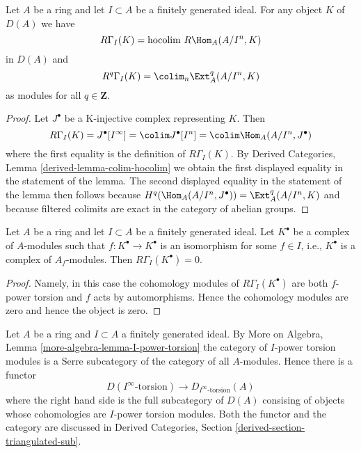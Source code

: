 \begin{lemma}
\label{lemma-local-cohomology-ext}
Let $A$ be a ring and let $I \subset A$ be a finitely generated ideal.
For any object $K$ of $D(A)$ we have
$$
R\Gamma_I(K) = \text{hocolim}\ R\Hom_A(A/I^n, K)
$$
in $D(A)$ and
$$
R^q\Gamma_I(K) = \colim_n \Ext_A^q(A/I^n, K)
$$
as modules for all $q \in \mathbf{Z}$.
\end{lemma}

\begin{proof}
Let $J^\bullet$ be a K-injective complex representing $K$. Then
$$
R\Gamma_I(K) = J^\bullet[I^\infty] = \colim J^\bullet[I^n] =
\colim \Hom_A(A/I^n, J^\bullet)
$$
where the first equality is the definition of $R\Gamma_I(K)$.
By Derived Categories, Lemma \ref{derived-lemma-colim-hocolim}
we obtain the first displayed equality in the statement of the lemma.
The second displayed equality in the statement of the lemma then
follows because $H^q(\Hom_A(A/I^n, J^\bullet)) = \Ext^q_A(A/I^n, K)$
and because filtered colimits are exact in the category of abelian
groups.
\end{proof}

\begin{lemma}
\label{lemma-bad-local-cohomology-vanishes}
Let $A$ be a ring and let $I \subset A$ be a finitely generated ideal.
Let $K^\bullet$ be a complex of $A$-modules such that
$f : K^\bullet \to K^\bullet$ is an isomorphism for some
$f \in I$, i.e., $K^\bullet$ is a complex of $A_f$-modules. Then
$R\Gamma_I(K^\bullet) = 0$.
\end{lemma}

\begin{proof}
Namely, in this case the cohomology modules of $R\Gamma_I(K^\bullet)$
are both $f$-power torsion and $f$ acts by automorphisms. Hence the
cohomology modules are zero and hence the object is zero.
\end{proof}

\noindent
Let $A$ be a ring and $I \subset A$ a finitely generated ideal.
By More on Algebra, Lemma \ref{more-algebra-lemma-I-power-torsion}
the category of $I$-power torsion modules is a Serre subcategory
of the category of all $A$-modules. Hence there is a functor
\begin{equation}
\label{equation-compare-torsion}
D(I^\infty\text{-torsion}) \longrightarrow D_{I^\infty\text{-torsion}}(A)
\end{equation}
where the right hand side is the full subcategory of $D(A)$
consising of objects whose cohomologies are $I$-power torsion modules.
Both the functor and the category are discussed in
Derived Categories, Section \ref{derived-section-triangulated-sub}.

